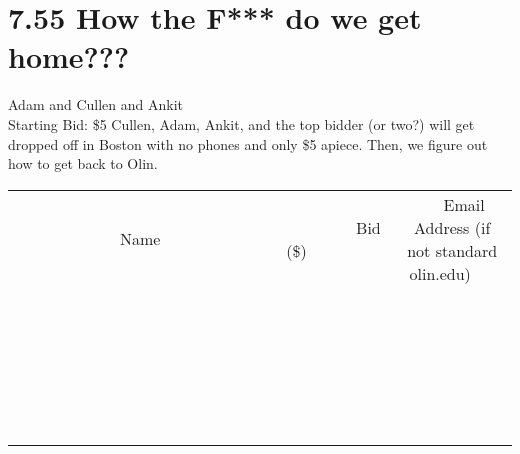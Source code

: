 \documentclass[11pt]{article}
\begin{document}
\section*{7.55 How the F*** do we get home???}
Adam and Cullen and Ankit
\\
Starting Bid: \$5
\newline
Cullen, Adam, Ankit, and the top bidder (or two?) will get dropped off in Boston with no phones and only \$5 apiece. Then, we figure out how to get back to Olin.
\\[6ex]
\begin{tabular}{c c c}
~~~~~~~~~~~~~Name~~~~~~~~~~~~~ & ~~~~~~~~~Bid (\$)~~~~~~~~~  & ~~~Email Address (if not standard olin.edu)~~~\\
 & & \\
\hline
 & & \\
\hline
 & & \\
\hline
 & & \\
\hline
 & & \\
\hline
 & & \\
\hline
 & & \\
\hline
 & & \\
\hline
 & & \\
\hline
 & & \\
\hline
 & & \\
\hline
 & & \\
\hline
 & & \\
\hline
 & & \\
\hline
 & & \\
\hline
 & & \\
\hline
 & & \\
\hline
 & & \\
\hline
 & & \\
\hline
 & & \\
\hline
 & & \\
\hline
 & & \\
\hline
 & & \\
\hline
 & & \\
\hline
 & & \\
\hline
 & & \\
\hline
\end{tabular}
\newpage
\end{document}
